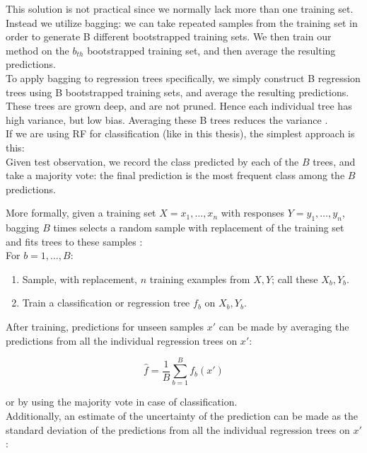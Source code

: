 This solution is not practical since we normally lack more than one training set. \\
Instead we utilize bagging: we can take repeated samples from the training set in order to generate B different bootstrapped training sets. We then train our method on the $b_{th}$ bootstrapped training set, and then average the resulting predictions. \\

To apply bagging to regression trees specifically, we simply construct B regression trees using B bootstrapped training sets, and average the resulting predictions. These trees are grown deep, and are not pruned. Hence each individual tree has high variance, but low bias. Averaging these B trees reduces the variance \cite{ISLR}. \\
If we are using RF for classification (like in this thesis), the simplest approach is this: \\
Given test observation, we record the class predicted by each of the $B$ trees, and take a majority vote: the final prediction is the most frequent class among the $B$ predictions.

More formally, given a training set $X = x_1, \dots, x_n$ with responses $Y = y_1, \dots, y_n$, bagging $B$ times selects a random sample with replacement of the training set and fits trees to these samples \cite{wiki:randomforest}: \\

For $b = 1, \dots, B$:
\begin{enumerate}[noitemsep]
	\item Sample, with replacement, $n$ training examples from $X, Y$; call these $X_b, Y_b$.
	\item Train a classification or regression tree $f_b$ on $X_b, Y_b$.
\end{enumerate}

After training, predictions for unseen samples $x'$ can be made by averaging the predictions from all the individual regression trees on $x'$:

\begin{equation}
	{{\hat {f}}={\frac {1}{B}}\sum _{b=1}^{B}f_{b}(x')}
\end{equation}

or by using the majority vote in case of classification.\\
				
Additionally, an estimate of the uncertainty of the prediction can be made as the standard deviation of the predictions from all the individual regression trees on $x'$:

